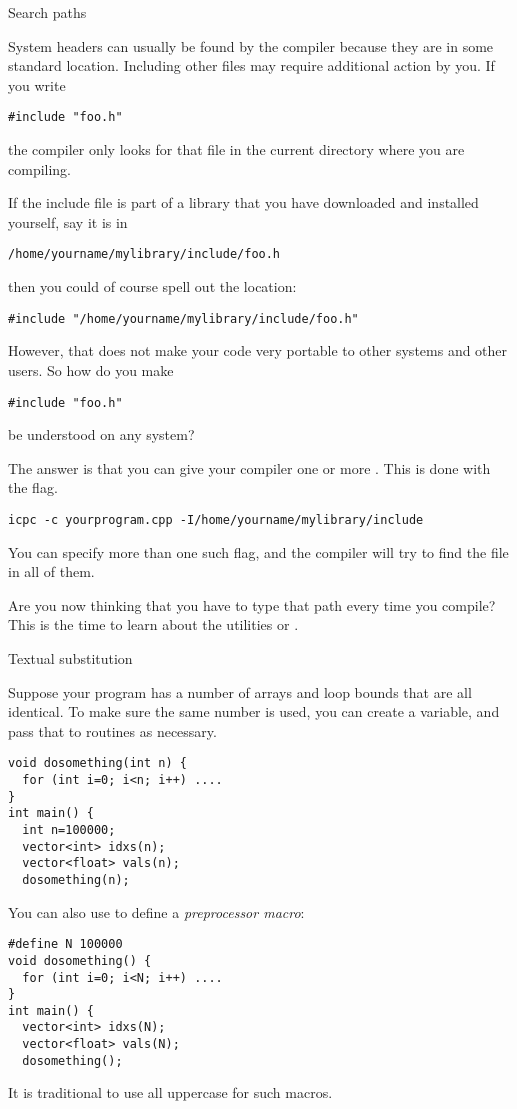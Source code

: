  {Search paths}

System headers can usually be found by the compiler because they
are in some standard location.
Including other files may require additional action by you.
If you write
\begin{lstlisting}
#include "foo.h"
\end{lstlisting}
the compiler only looks for that file in the current directory
where you are compiling.

If the include file is part of a library that you have downloaded
and installed yourself, say it is in
\begin{verbatim}
/home/yourname/mylibrary/include/foo.h
\end{verbatim}
then you could of course spell out the location:
\begin{lstlisting}
#include "/home/yourname/mylibrary/include/foo.h"
\end{lstlisting}
However, that does not make your code very portable to other systems
and other users.
So how do you make
\begin{lstlisting}
#include "foo.h"
\end{lstlisting}
be understood on any system?

The answer is that you can give your compiler one or more .
This is done with the  flag.
\begin{verbatim}
icpc -c yourprogram.cpp -I/home/yourname/mylibrary/include
\end{verbatim}
You can specify more than one such flag, and the compiler will try to find
the  file in all of them.

Are you now thinking that you have to type that path every time you compile?
This is the time to learn about the utilities
 
or  .

 {Textual substitution}

Suppose your program has a number of arrays and loop bounds that are
all identical. To make sure the same number is used, you can create a
variable, and pass that to routines as necessary.
\begin{lstlisting}
void dosomething(int n) {
  for (int i=0; i<n; i++) ....
}
int main() {
  int n=100000;
  vector<int> idxs(n);
  vector<float> vals(n);
  dosomething(n);
\end{lstlisting}
You can also use  to define a
\emph{preprocessor macro}:
\begin{lstlisting}
#define N 100000
void dosomething() {
  for (int i=0; i<N; i++) ....
}
int main() {
  vector<int> idxs(N);
  vector<float> vals(N);
  dosomething();
\end{lstlisting}
It is traditional to use all uppercase for such macros.

